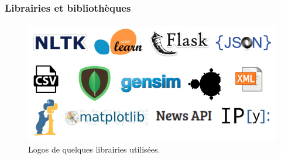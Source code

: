         \subsubsection{Librairies et bibliothèques}\label{def-tools}
            \begin{figure}[h]
                    \centering
                    \includegraphics[height=150pt,width=320pt]{img/chapter4/tools/tools.png}
                    \caption{Logos de quelques librairies utilisées.}
                    \label{}
            \end{figure}
